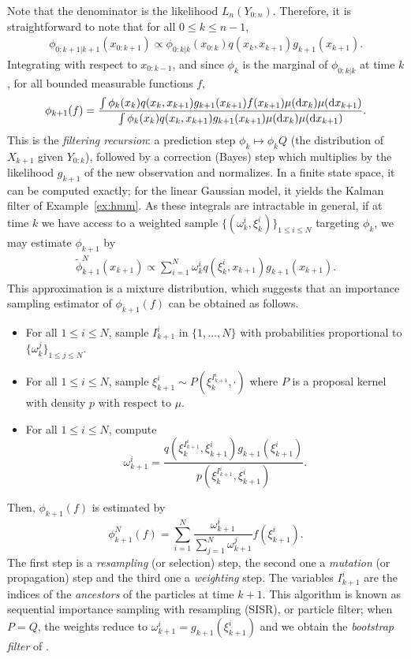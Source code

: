 \documentclass[english,graybox,envcountchap,envcountsame,sectrefs,shortlabels]{svmono}
\theoremstyle{style}
\newcommand{\eqsp}{}
\begin{document}
Note that the denominator is the likelihood $L_n(Y_{0:n})$. Therefore, it is straightforward to note that for all $0\leq k \leq n-1$,
\begin{align*}
\phi_{0:k+1|k+1}(x_{0:k+1}) \propto \phi_{0:k|k}(x_{0:k})q(x_{k}, x_{k+1})g_{k+1}(x_{k+1})\eqsp.
\end{align*}
Integrating with respect to $x_{0:k-1}$, and since $\phi_k$ is the marginal of $\phi_{0:k|k}$ at time $k$, for all bounded measurable functions $f$,
\begin{equation}
\label{eq:filtering:recursion}
\phi_{k+1}(f) = \frac{\int \phi_{k}(x_{k})q(x_{k}, x_{k+1})g_{k+1}(x_{k+1})f(x_{k+1})\mu(\rmd x_{k})\mu(\rmd x_{k+1})}{\int \phi_{k}(x_{k})q(x_{k}, x_{k+1})g_{k+1}(x_{k+1})\mu(\rmd x_{k})\mu(\rmd x_{k+1})}\eqsp.
\end{equation}
This is the \emph{filtering recursion}: a prediction step $\phi_k\mapsto\phi_kQ$ (the distribution of $X_{k+1}$ given $Y_{0:k}$), followed by a correction (Bayes) step which multiplies by the likelihood $g_{k+1}$ of the new observation and normalizes. In a finite state space, it can be computed exactly; for the linear Gaussian model, it yields the Kalman filter of Example~\ref{ex:hmm}.
As these integrals are intractable in general, if at time $k$ we have access to a weighted sample $\{(\omega_k^i,\xi_k^i) \}_{1\leq i \leq N}$ targeting $\phi_k$, we may estimate $\phi_{k+1}$ by
\begin{align*}
\tilde\phi^N_{k+1}(x_{k+1}) \propto \sum_{i=1}^N\omega_k^iq(\xi^i_{k}, x_{k+1})g_{k+1}(x_{k+1})\eqsp.
\end{align*}
This approximation is a mixture distribution, which suggests that an importance sampling estimator of $\phi_{k+1}(f)$ can be obtained as follows.
\begin{itemize}
\item For all $1\leq i \leq N$, sample $I_{k+1}^i$ in $\{1,\ldots, N\}$ with probabilities proportional to $\{\omega_k^j\}_{1\leq j \leq N}$.
\item For all $1\leq i \leq N$, sample $\xi_{k+1}^i \sim P(\xi_k^{I_{k+1}^i},\cdot)$ where $P$ is a proposal kernel with density $p$ with respect to $\mu$.
\item For all $1\leq i \leq N$, compute
$$
\omega_{k+1}^i = \frac{q(\xi_k^{I_{k+1}^i}, \xi^i_{k+1})g_{k+1}(\xi^i_{k+1})}{p(\xi_k^{I_{k+1}^i},\xi_{k+1}^i)}\eqsp.
$$
\end{itemize}
Then, $\phi_{k+1}(f) $ is estimated by
$$
\phi^N_{k+1}(f) = \sum_{i=1}^N\frac{\omega_{k+1}^i}{\sum_{j=1}^N\omega_{k+1}^j}f(\xi_{k+1}^i)\eqsp.
$$
The first step is a \emph{resampling} (or selection) step, the second one a \emph{mutation} (or propagation) step and the third one a \emph{weighting} step. The variables $I^i_{k+1}$ are the indices of the \emph{ancestors} of the particles at time $k+1$. This algorithm is known as sequential importance sampling with resampling (SISR), or particle filter; when $P = Q$, the weights reduce to $\omega^i_{k+1} = g_{k+1}(\xi^i_{k+1})$ and we obtain the \emph{bootstrap filter} of \cite{GordonSalmondSmith1993}.
\end{document}
